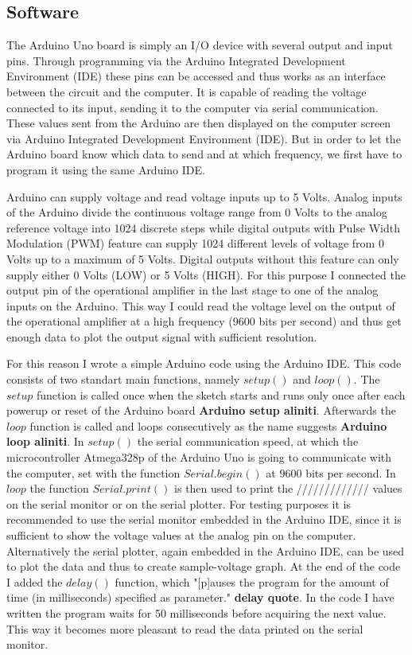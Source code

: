 \subsection{Software}
The Arduino Uno board is simply an I/O device with several output and input pins. Through programming via the Arduino Integrated Development Environment (IDE) these pins can be accessed and thus works as an interface between the circuit and the computer. It is capable of reading the voltage connected to its input, sending it to the computer via serial communication. These values sent from the Arduino are then displayed on the computer screen via Arduino Integrated Development Environment (IDE). But in order to let the Arduino board know which data to send and at which frequency, we first have to program it using the same Arduino IDE.\par
Arduino can supply voltage and read voltage inputs up to 5 Volts. Analog inputs of the Arduino divide the continuous voltage range from 0 Volts to the analog reference voltage into 1024 discrete steps while digital outputs with Pulse Width Modulation (PWM) feature can supply 1024 different levels of voltage from 0 Volts up to a maximum of 5 Volts. Digital outputs without this feature can only supply either 0 Volts (LOW) or 5 Volts (HIGH). For this purpose I connected the output pin of the operational amplifier in the last stage to one of the analog inputs on the Arduino. This way I could read the voltage level on the output of the operational amplifier at a high frequency (9600 bits per second) and thus get enough data to plot the output signal with sufficient resolution. \par
For this reason I wrote a simple Arduino code using the Arduino IDE. This code consists of two standart main functions, namely $setup()$ and $loop()$. The $setup$ function is called once when the sketch starts and runs only once after each powerup or reset of the Arduino board \textbf{Arduino setup aliniti}. Afterwards the $loop$ function is called and loops consecutively as the name suggests \textbf{Arduino loop aliniti}. In $setup()$ the serial communication speed, at which the microcontroller Atmega328p of the Arduino Uno is going to communicate with the computer, set with the function $Serial.begin()$ at 9600 bits per second. In $loop$ the function $Serial.print()$ is then used to print the ///////////// values on the serial monitor or on the serial plotter. For testing purposes it is recommended to use the serial monitor embedded in the Arduino IDE, since it is sufficient to show the voltage values at the analog pin on the computer. Alternatively the serial plotter, again embedded in the Arduino IDE, can be used to plot the data and thus to create sample-voltage graph. At the end of the code I added the $delay()$ function, which "[p]auses the program for the amount of time (in milliseconds) specified as parameter." \textbf{delay quote}. In the code I have written the program waits for 50 milliseconds before acquiring the next value. This way it becomes more pleasant to read the data printed on the serial monitor.

